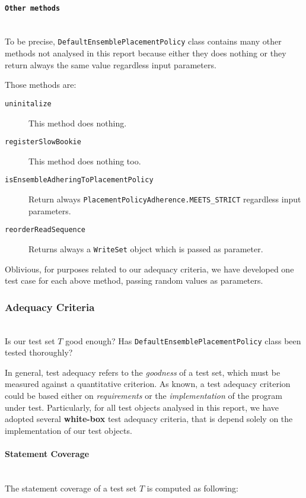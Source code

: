 \documentclass[sigconf]{acmart}
\begin{document}
\paragraph{\texttt{Other methods}}
\hfill\\
To be precise, \texttt{DefaultEnsemblePlacementPolicy} class contains many other methods not analysed in this report because either they does nothing or they return always the same value regardless input parameters.

Those methods are:
\begin{description}
\item[\texttt{uninitalize}] This method does nothing.
\item[\texttt{registerSlowBookie}] This method does nothing too.
\item[\texttt{isEnsembleAdheringToPlacementPolicy}] Return always \texttt{Place\-ment\-Policy\-Adherence.MEETS\_STRICT} regardless input parameters.
\item[\texttt{reorderReadSequence}] Returns always a \texttt{WriteSet} object which is passed as parameter.
\end{description}

Oblivious, for purposes related to our adequacy criteria, we have developed one test case for each above method, passing random values as parameters.

\subsubsection{Adequacy Criteria}
\hfill\\
Is our test set $T$ good enough? Has \texttt{DefaultEnsemblePlacementPolicy} class been tested thoroughly?

In general, test adequacy refers to the \textit{goodness} of a test set, which must be measured against a quantitative criterion. As known, a test adequacy criterion could be based either on \textit{requirements} or the \textit{implementation} of the program under test. Particularly, for all test objects analysed in this report, we have adopted several \textbf{white-box} test adequacy criteria, that is depend solely on the implementation of our test objects.

\paragraph{Statement Coverage}
\hfill\\
The statement coverage of a test set $T$ is computed as following\cite{AngelisBook}:
\end{document}
